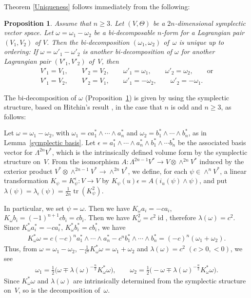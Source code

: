 \documentclass[pdftex]{sigma}
\newtheorem{Prop}[Th]{Proposition}
\begin{document}
Theorem \ref{Uniqueness} follows immediately from the following:

\begin{Prop}
\label{uniqueness 2}
Assume that $n\geq 3$.
Let $(V,\Theta)$ be a $2n$-dimensional symplectic vector space.
Let $\omega=\omega_1-\omega_2$ be a bi-decomposable
$n$-form for a Lagrangian pair $(V_1, V_2)$ of $V$.
Then the bi-decomposition $(\omega_1, \omega_2)$ of~$\omega$
is unique up to ordering:
If $\omega=\omega'_1-\omega'_2$ is another bi-decomposition
of $\omega$ for another Lagrangian pair $(V'_1, V'_2)$ of~$V$, then
\begin{gather*}
V'_1 = V_1, \qquad V'_2 = V_2, \qquad \omega'_1 = \omega_1, \qquad \omega'_2 = \omega_2,
\qquad {\mathrm{or}} \\
V'_1 = V_2, \qquad V'_2 = V_1, \qquad \omega'_1 = - \omega_2, \qquad \omega'_2 = - \omega_1.
\end{gather*}
\end{Prop}



The bi-decomposition of $\omega$ (Proposition~\ref{uniqueness 2})
is given by using the symplectic structure,
based on Hitchin's result \cite[Propositions 2.1,~2.2]{H},
in the case that $n$ is odd and $n \geq 3$, as follows:

Let $\omega = \omega_1 - \omega_2$, with
$\omega_1 = c a_1^*\wedge \cdots \wedge a_n^*$
and
$\omega_2 = b_1^*\wedge \cdots \wedge b_n^*$, as in
Lemma~\ref{symplectic basis}.
Let $\epsilon=a^*_1\wedge \cdots \wedge a^*_n
\wedge b^*_1\wedge \cdots b^*_n$
be the associated basis vector for $\Lambda^{2n}V^*$,
which is the
intrinsically def\/ined volume form by the symplectic structure on~$V$.
From the isomorphism $A\colon \Lambda^{2n-1}V^* \longrightarrow
V\otimes \wedge^{2n}V^*$ induced by the exterior product
$V^*\otimes\wedge^{2n-1}V^* \to \wedge^{2n}V^*$,
we def\/ine, for each $\psi \in \wedge^nV^*$,
a linear transformation
$K_{\psi}=K_{\psi}^{\epsilon}\colon V \longrightarrow V$ by
$K_{\psi}(u)\epsilon = A(i_u(\psi)\wedge \psi)$, and put
$\lambda(\psi)=\lambda_{\epsilon}(\psi)=
\frac{1}{2n}\operatorname{tr}(K_{\psi}^2)$.

In particular, we set $\psi = \omega$.
Then we have $K_{\omega}a_i=-c a_i$, $K_{\omega}b_i
= (-1)^{n+1} c b_i = cb_i$.
Then we have $K_{\omega}^2 = c^2\operatorname{id}$,
therefore $\lambda(\omega) = c^2$.
Since $K_{\omega}^*a_i^* = -ca_i^*$, $K_{\omega}^*b_i^* =cb_i^* $,
we have
\begin{gather*}
K_{\omega}^*\omega = c(-c)^n a^*_1\wedge \cdots \wedge a^*_n -
c^{n}b^*_1\wedge \cdots \wedge b^*_n =
(-c)^n(\omega_1 + \omega_2).
\end{gather*}
Thus, from
$\omega={\omega}_1-{\omega}_2$, $-\frac{1}{c^n}K_{\omega}^*\omega={\omega}_1+{\omega}_2$
and $\lambda(\omega) = c^2$ $(c >0, <0)$,
we see
\begin{gather*}
\omega_1 = \frac{1}{2}\big(\omega \mp \lambda(\omega)^{-\frac{n}{2}}
K_{\omega}^*\omega\big),\qquad
\omega_2= \frac{1}{2}\big({-}\omega \mp \lambda(\omega)^{-\frac{n}{2}}
K_{\omega}^*\omega\big).
\end{gather*}
Since $K_{\omega}^*\omega$ and $\lambda(\omega)$ are
intrinsically determined from the symplectic structure on~$V$,
so is the decomposition of~$\omega$.
\end{document}
